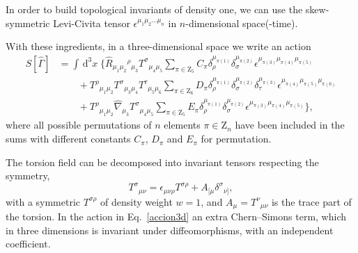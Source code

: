 \documentclass{ws-mpla}
\renewcommand{\(}{\left(}
\renewcommand{\)}{\right)}
\renewcommand{\[}{\left[}
\renewcommand{\]}{\right]}
\newcommand{\dn}[2]{\,{\mathrm{d}}^{#1}\!{#2}\;}
\begin{document}
In order to build topological invariants of density one, we can use the skew-symmetric Levi-Civita tensor $\epsilon^{\mu_1\mu_2\dots\mu_n}$ in $n$-dimensional space(-time).


With these ingredients, in a three-dimensional space we write an action 
\begin{equation}
  \label{accion3d}
  \begin{split}
    S[\hat{\Gamma}] &=
    \int \dn{3}{x}  \Bigg\{
    \hat{R}_{\mu_1\mu_2}{}^\rho{}_{\mu_3} T^\sigma{}_{\mu_4\mu_5} \sum_{\pi \in  \mathrm{Z}_5}C_\pi\delta_\rho^{\mu_{\pi(1)}} \delta_\sigma^{\mu_{\pi(2)}} \epsilon^{\mu_{\pi(3)}\mu_{\pi(4)}\mu_{\pi(5)}} \\
    & \qquad + T^\rho{}_{\mu_1\mu_2} T^\sigma{}_{\mu_3\mu_4} T^\tau{}_{\mu_5\mu_6} \sum_{\pi \in \mathrm{Z}_6}D_\pi\delta_\rho^{\mu_{\pi(1)}} \delta_\sigma^{\mu_{\pi(2)}}\delta_\tau^{\mu_{\pi(3)}}\epsilon^{\mu_{\pi(4)}\mu_{\pi(5)}\mu_{\pi(6)}} \\
    & \qquad + T^\rho{}_{\mu_1\mu_2} \hat{\nabla}_{\mu_3} T^\sigma{}_{\mu_4\mu_5}\sum_{\pi \in \mathrm Z_5}E_\pi\delta_\rho^{\mu_{\pi(1)}} \delta_\sigma^{\mu_{\pi(2)}}\epsilon^{\mu_{\pi(3)}\mu_{\pi(4)}\mu_{\pi(5)}} \Bigg\},
  \end{split}
\end{equation}
where all possible permutations of $n$ elements $\pi \in \mathrm{Z}_n$ have been included in the sums with  different constants $C_\pi$, $D_\pi$ and $E_\pi$ for  permutation. 

The torsion field can be decomposed into invariant tensors respecting the symmetry,
\begin{equation}
  T^\sigma{}_{\mu\nu} = \epsilon_{\mu\nu\rho} T^{\sigma\rho} + A_{[\mu}\delta^\sigma{}_{\nu]},
\end{equation}
with a symmetric $T^{\sigma\rho}$ of density weight  $w = 1$, and \mbox{$A_\mu = T^\nu{}_{\mu\nu}$} is the trace part of the torsion.
In the action in Eq.~\eqref{accion3d} an extra Chern--Simons term, which in three dimensions is invariant under diffeomorphisms, with an independent coefficient.
\end{document}
